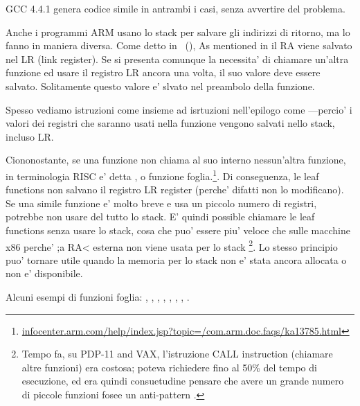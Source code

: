 GCC 4.4.1 genera codice simile in antrambi i casi, senza avvertire del problema.


Anche i programmi ARM usano lo stack per salvare gli indirizzi di ritorno, ma lo fanno in maniera diversa.
Come detto in \q{\HelloWorldSectionName}~(),
As mentioned in 
il \ac{RA} viene salvato nel \ac{LR} (\gls{link register}).
Se si presenta comunque la necessita' di chiamare un'altra funzione ed usare il registro \ac{LR} ancora una volta, 
il suo valore deve essere salvato.
Solitamente questo valore e' slvato nel preambolo della funzione.

Spesso vediamo istruzioni come  insieme ad isrtuzioni nell'epilogo come 
---percio' i valori dei registri che saranno usati nella funzione vengono salvati nello stack, incluso \ac{LR}.

Ciononostante, se una funzione non chiama al suo interno nessun'altra funzione, in terminologia \ac{RISC} e' detta 
, o funzione foglia.\footnote{\href{http://go.yurichev.com/17064}{infocenter.arm.com/help/index.jsp?topic=/com.arm.doc.faqs/ka13785.html}}. 
Di conseguenza, le leaf functions non salvano il registro \ac{LR} register (perche' difatti non lo modificano).
Se una simile funzione e' molto breve e usa un piccolo numero di registri, potrebbe non usare del tutto lo stack. 
E' quindi possible chiamare le leaf functions senza usare lo stack, cosa che puo' essere piu' veloce che sulle macchine x86 perche' ;a RA< esterna non viene usata per lo stack
\footnote{Tempo fa, su PDP-11 and VAX, l'istruzione CALL instruction (chiamare altre funzioni) era costosa; poteva richiedere fino al 50\%
del tempo di esecuzione, ed era quindi consuetudine pensare che avere un grande numero di piccole funzioni fosee un \gls{anti-pattern} .}.
Lo stesso principio puo' tornare utile quando la memoria per lo stack non e' stata ancora allocata o non e' disponibile.

Alcuni esempi di funzioni foglia:
, , 
, , ,
, , .
